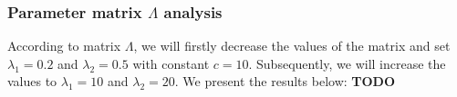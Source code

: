 \documentclass[a4paper]{article}
\begin{document}
\subsubsection{Parameter matrix $\Lambda$ analysis}
According to matrix $\Lambda$, we will firstly decrease the values of the matrix and set $\lambda_1 = 0.2$ 
and $\lambda_2 = 0.5$ with constant $c=10$. Subsequently, we will increase the values to $\lambda_1 = 10$ and $\lambda_2 = 20$. 
We present the results below:
\textbf{TODO}
\end{document}
